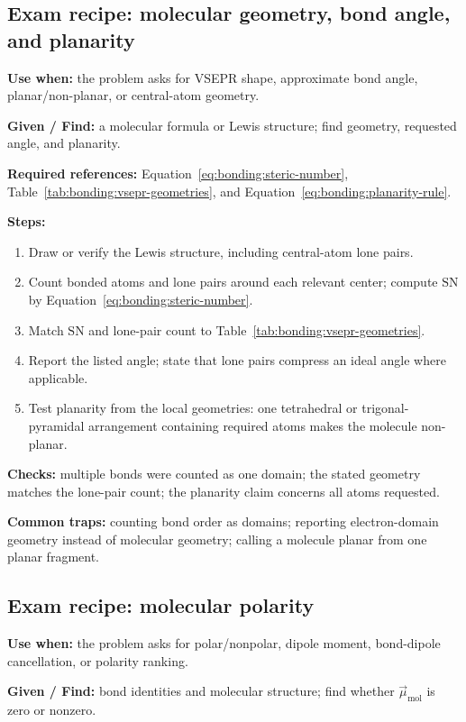 \subsection{Exam recipe: molecular geometry, bond angle, and planarity}
\textbf{Use when:} the problem asks for VSEPR shape, approximate bond angle, planar/non-planar, or central-atom geometry.

\textbf{Given / Find:} a molecular formula or Lewis structure; find geometry, requested angle, and planarity.

\textbf{Required references:} Equation~\ref{eq:bonding:steric-number}, Table~\ref{tab:bonding:vsepr-geometries}, and Equation~\ref{eq:bonding:planarity-rule}.

\textbf{Steps:}
\begin{enumerate}
    \item Draw or verify the Lewis structure, including central-atom lone pairs.
    \item Count bonded atoms and lone pairs around each relevant center; compute \(\mathrm{SN}\) by Equation~\ref{eq:bonding:steric-number}.
    \item Match \(\mathrm{SN}\) and lone-pair count to Table~\ref{tab:bonding:vsepr-geometries}.
    \item Report the listed angle; state that lone pairs compress an ideal angle where applicable.
    \item Test planarity from the local geometries: one tetrahedral or trigonal-pyramidal arrangement containing required atoms makes the molecule non-planar.
\end{enumerate}

\textbf{Checks:} multiple bonds were counted as one domain; the stated geometry matches the lone-pair count; the planarity claim concerns all atoms requested.

\textbf{Common traps:} counting bond order as domains; reporting electron-domain geometry instead of molecular geometry; calling a molecule planar from one planar fragment.

\subsection{Exam recipe: molecular polarity}
\textbf{Use when:} the problem asks for polar/nonpolar, dipole moment, bond-dipole cancellation, or polarity ranking.

\textbf{Given / Find:} bond identities and molecular structure; find whether \(\vec{\mu}_{\mathrm{mol}}\) is zero or nonzero.

